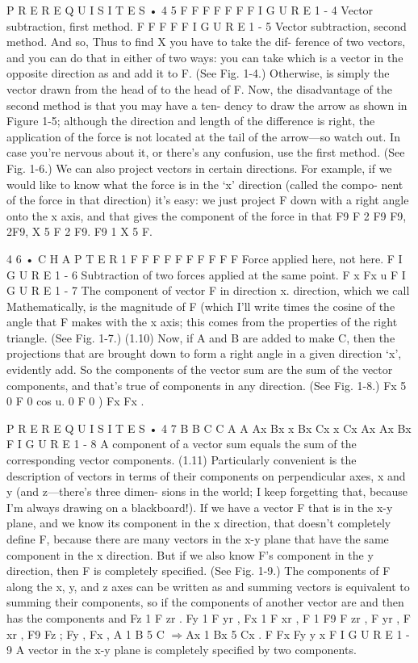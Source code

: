 \documentclass[10pt,oneside]{article}
\begin{document}
P R E R E Q U I S I T E S • 4 5 F F F    F F F F I G U R E 1 - 4 Vector subtraction, first method. F   F F F F I G U R E 1 - 5 Vector subtraction, second method. And so, Thus to find X you have to take the dif- ference of two vectors, and you can do that in either of two ways: you can take which is a vector in the opposite direction as and add it to F. (See Fig. 1-4.) Otherwise, is simply the vector drawn from the head of to the head of F. Now, the disadvantage of the second method is that you may have a ten- dency to draw the arrow as shown in Figure 1-5; although the direction and length of the difference is right, the application of the force is not located at the tail of the arrow---so watch out. In case you’re nervous about it, or there’s any confusion, use the first method. (See Fig. 1-6.) We can also project vectors in certain directions. For example, if we would like to know what the force is in the ‘x’ direction (called the compo- nent of the force in that direction) it’s easy: we just project F down with a right angle onto the x axis, and that gives the component of the force in that F9 F 2 F9 F9, 2F9, X 5 F 2 F9. F9 1 X 5 F.\par

4 6 • C H A P T E R  1 F F F    F F F F   F F F Force applied here, not here. F I G U R E 1 - 6 Subtraction of two forces applied at the same point. F x Fx u F I G U R E 1 - 7 The component of vector F in direction x. direction, which we call Mathematically, is the magnitude of F (which I’ll write times the cosine of the angle that F makes with the x axis; this comes from the properties of the right triangle. (See Fig. 1-7.) (1.10) Now, if A and B are added to make C, then the projections that are brought down to form a right angle in a given direction ‘x’, evidently add. So the components of the vector sum are the sum of the vector components, and that’s true of components in any direction. (See Fig. 1-8.) Fx 5 0 F 0  cos u. 0 F 0 ) Fx Fx .\par

P R E R E Q U I S I T E S • 4 7 B B C C A A Ax Bx x Bx Cx x Cx Ax Ax Bx F I G U R E 1 - 8 A component of a vector sum equals the sum of the corresponding vector components. (1.11) Particularly convenient is the description of vectors in terms of their components on perpendicular axes, x and y (and z---there’s three dimen- sions in the world; I keep forgetting that, because I’m always drawing on a blackboard!). If we have a vector F that is in the x-y plane, and we know its component in the x direction, that doesn’t completely define F, because there are many vectors in the x-y plane that have the same component in the x direction. But if we also know F’s component in the y direction, then F is completely specified. (See Fig. 1-9.) The components of F along the x, y, and z axes can be written as and summing vectors is equivalent to summing their components, so if the components of another vector are and then has the components and Fz 1 F zr . Fy 1 F yr  , Fx 1 F xr  , F 1 F9 F zr , F yr  , F xr  , F9 Fz ; Fy , Fx , A 1 B 5 C \ensuremath{\Rightarrow}Ax 1 Bx 5 Cx . F Fx Fy y x F I G U R E 1 - 9 A vector in the x-y plane is completely specified by two components.\par
\end{document}
